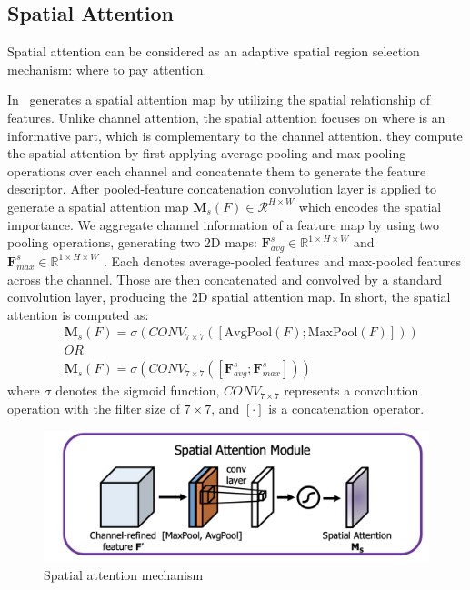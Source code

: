 \subsection{Spatial Attention}
Spatial attention can be considered as an adaptive spatial region selection mechanism: where to pay attention.

In~\cite{woo2018cbam} generates a spatial attention map by utilizing the spatial relationship of features. Unlike channel attention, the spatial attention focuses on where is an informative part, which is complementary to the channel attention. they compute the spatial attention by first applying average-pooling and max-pooling operations over each channel and concatenate them to generate the  feature descriptor. After pooled-feature concatenation convolution layer is applied to generate a spatial attention map $\textbf{M}_{s}\left(F\right) \in \mathcal{R}^{H×W}$ which encodes the spatial importance.
We aggregate channel information of a feature map by using two pooling operations, generating two 2D maps:
$\mathbf{F}^{s}_{avg} \in \mathbb{R}^{1\times{H}\times{W}}$
and $\mathbf{F}^{s}_{max} \in \mathbb{R}^{1\times{H}\times{W}}$ . Each denotes average-pooled features and max-pooled features across the channel. Those are then concatenated and convolved by a standard convolution layer, producing the 2D spatial attention map. In short, the spatial attention is computed as:
\begin{equation}\begin{split}
    &\textbf{M}_{s}\left(F\right) = \sigma\left(CONV_{7\times7}\left(\left[\text{AvgPool}\left(F\right);\text{MaxPool}\left(F\right)\right]\right)\right) \\
    &OR\\
    & \textbf{M}_{s}\left(F\right) = \sigma\left(CONV_{7\times7}\left(\left[\mathbf{F}^{s}_{avg};\mathbf{F}^{s}_{max} \right]\right)\right) 
\end{split}\end{equation}
where $\sigma$ denotes the sigmoid function,  $CONV_{7\times7}$ represents a convolution operation with the filter size of $7\times7$, and $[\cdot]$ is a concatenation operator.
\begin{figure}
    \begin{center}
        \includegraphics[width=\textwidth]{Figures/SpatialAttentionExample.png}
        \caption{\label{fig:spattex} Spatial attention mechanism }
    \end{center}
\end{figure}

